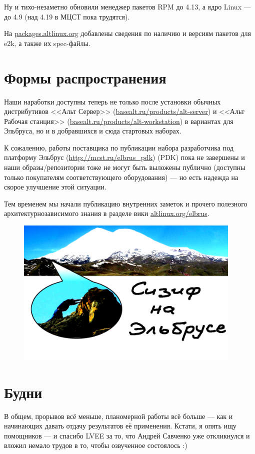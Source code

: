 \documentclass[10pt, a5paper]{article}
\begin{document}
Ну и тихо-незаметно обновили менеджер пакетов RPM до 4.13, а ядро Linux --- до 4.9 (над 4.19 в МЦСТ пока трудятся).

На \href{http://packages.altlinux.org}{packages.altlinux.org} добавлены сведения по наличию и версиям пакетов для e2k, а также их spec-файлы.

\section*{Формы распространения}

\noindent Наши наработки доступны теперь не только после установки обычных дистрибутивов <<Альт Сервер>> (\href{http://basealt.ru/products/alt-server}{basealt.ru/products/alt-server}) и <<Альт Рабочая станция>> (\href{http://basealt.ru/products/alt-workstation}{basealt.ru/products/alt-workstation}) в вариантах для Эльбруса, но и в добравшихся и сюда стартовых наборах.

К сожалению, работы поставщика по публикации набора разработчика под платформу Эльбрус (\url{http://mcst.ru/elbrus_pdk}) (PDK) пока не завершены и наши образы/репозитории тоже не могут быть выложены публично (доступны только покупателям соответствующего оборудования) --- но есть надежда на скорое улучшение этой ситуации.

Тем временем мы начали публикацию внутренних заметок и прочего полезного архитектурнозависимого знания в разделе вики \href{http://altlinux.org/elbrus}{altlinux.org/elbrus}.

\begin{center}
\begin{figure}[h!]
  \centering
  \includegraphics[width=10.8cm]{2019_Shigorin.png}

  \label{fig1}
\end{figure}
\end{center} 

\section*{Будни}

В общем, прорывов всё меньше, планомерной работы всё больше --- как и начинающих давать отдачу результатов её применения.
Кстати, я опять ищу помощников --- и спасибо LVEE за то, что Андрей Савченко уже откликнулся и вложил немало трудов в то, чтобы озвученное состоялось :)
\end{document}
